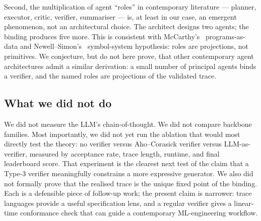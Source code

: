 Second, the multiplication of agent ``roles'' in contemporary
literature --- planner, executor, critic, verifier, summariser
--- is, at least in our case, an emergent phenomenon, not an
architectural choice.  The architect designs two agents; the
binding produces five more.  This is consistent with
McCarthy's~\cite{mccarthy1960lisp} programs-as-data and
Newell--Simon's~\cite{newell1976physical} symbol-system
hypothesis: roles are projections, not primitives.  We
conjecture, but do not here prove, that other contemporary agent
architectures admit a similar derivation: a small number of
principal agents binds a verifier, and the named roles are
projections of the validated trace.

\subsection{What we did not do}

We did not measure the LLM's chain-of-thought.  We did not
compare backbone families.  Most importantly, we did not yet run the
ablation that would most directly test the theory: no verifier versus
Aho--Corasick verifier versus LLM-as-verifier, measured by acceptance
rate, trace length, runtime, and final leaderboard score.  That
experiment is the clearest next test of the claim that a Type-3
verifier meaningfully constrains a more expressive generator.  We
also did not formally prove that the realised trace is the unique
fixed point of the binding.  Each is a defensible piece of follow-up
work; the present claim is narrower: trace languages provide a useful
specification lens, and a regular verifier gives a linear-time
conformance check that can guide a contemporary ML-engineering
workflow.
